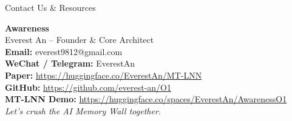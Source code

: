 ﻿\documentclass[aspectratio=169, 10pt]{beamer}
\begin{document}
\begin{frame}{Contact Us \& Resources}
\begin{center}
    \LARGE \textbf{Awareness} \\
    \vspace{0.5em}
    \large Everest An -- Founder \& Core Architect \\
    \vspace{1.5em}
    \normalsize
    \textbf{Email:} everest9812@gmail.com \\
    \textbf{WeChat / Telegram:} EverestAn \\
    \vspace{1.5em}
    \small
    \textbf{Paper:} \url{https://huggingface.co/EverestAn/MT-LNN} \\
    \textbf{GitHub:} \url{https://github.com/everest-an/O1} \\
    \textbf{MT-LNN Demo:} \url{https://huggingface.co/spaces/EverestAn/AwarenessO1} \\
    \vspace{1.5em}
    \textit{Let's crush the AI Memory Wall together.}
\end{center}
\end{frame}
\end{document}
